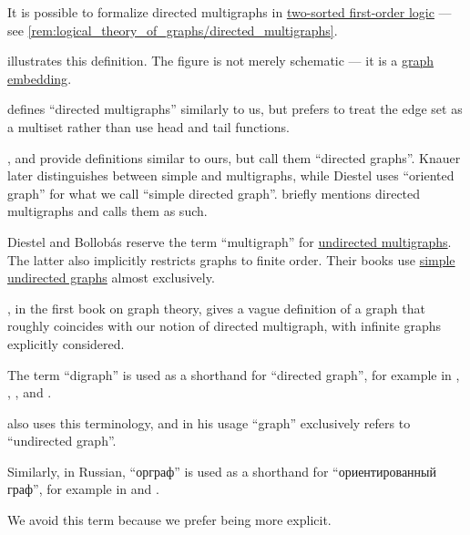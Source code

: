 \begin{comments}
  \item It is possible to formalize directed multigraphs in \hyperref[def:many_sorted_fol]{two-sorted first-order logic} --- see \cref{rem:logical_theory_of_graphs/directed_multigraphs}.

  \item {} illustrates this definition. The figure is not merely schematic --- it is a \hyperref[def:graph_geometric_realization/embedding]{graph embedding}.

  \item \Textcite[675]{Rosen2019DiscreteMathematics} defines \enquote{directed multigraphs} similarly to us, but prefers to treat the edge set as a multiset rather than use head and tail functions.

  \textcite[def. 1.1.1]{Knauer2019AlgebraicGraphTheory}, \textcite[10]{MacLane1998CategoryTheory} and \textcite[28]{Diestel2017GraphTheory} provide definitions similar to ours, but call them \enquote{directed graphs}. Knauer later distinguishes between simple and multigraphs, while Diestel uses \enquote{oriented graph} for what we call \enquote{simple directed graph}. \Textcite[8]{Bollobás1998ModernGraphTheory} briefly mentions directed multigraphs and calls them as such.

  Diestel and Bollob\'as reserve the term \enquote{multigraph} for \hyperref[def:hypergraph/multigraph]{undirected multigraphs}. The latter also implicitly restricts graphs to finite order. Their books use \hyperref[def:undirected_graph]{simple undirected graphs} almost exclusively.

  \Textcite[1]{König1986Graphentheorie}, in the first book on graph theory, gives a vague definition of a graph that roughly coincides with our notion of directed multigraph, with infinite graphs explicitly considered.
\end{comments}

\begin{remark}\label{rem:digraph}
  The term \enquote{digraph} is used as a shorthand for \enquote{directed graph}, for example in
  \cite[10]{Harary1969GraphTheory},
  \cite[def. 1.1.1]{Knauer2019AlgebraicGraphTheory},
  \cite[def. 10.1.2]{Rosen2019DiscreteMathematics},
  \cite[571]{Stanley2012EnumerativeCombinatoricsVol1} and
  \cite[372]{Knuth1997ArtVol1}.

  \Textcite[28]{Diestel2017GraphTheory} also uses this terminology, and in his usage \enquote{graph} exclusively refers to \enquote{undirected graph}.

  Similarly, in Russian, \enquote{орграф} is used as a shorthand for \enquote{ориентированный граф}, for example in
  \cite[\S 7.1.5]{Новиков2013ДискретнаяМатематика} and
  \cite[279]{ЕмеличевИПр1990ТеорияГрафов}.

  We avoid this term because we prefer being more explicit.
\end{remark}

